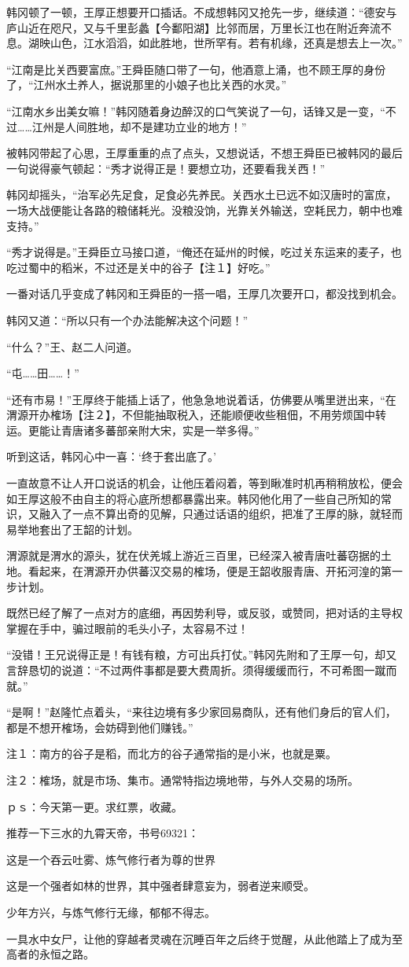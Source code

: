 韩冈顿了一顿，王厚正想要开口插话。不成想韩冈又抢先一步，继续道：“德安与庐山近在咫尺，又与千里彭蠡【今鄱阳湖】比邻而居，万里长江也在附近奔流不息。湖映山色，江水滔滔，如此胜地，世所罕有。若有机缘，还真是想去上一次。”

“江南是比关西要富庶。”王舜臣随口带了一句，他酒意上涌，也不顾王厚的身份了，“江州水土养人，据说那里的小娘子也比关西的水灵。”

“江南水乡出美女嘛！”韩冈随着身边醉汉的口气笑说了一句，话锋又是一变，“不过……江州是人间胜地，却不是建功立业的地方！”

被韩冈带起了心思，王厚重重的点了点头，又想说话，不想王舜臣已被韩冈的最后一句说得豪气顿起：“秀才说得正是！要想立功，还要看我关西！”

韩冈却摇头，“治军必先足食，足食必先养民。关西水土已远不如汉唐时的富庶，一场大战便能让各路的粮储耗光。没粮没饷，光靠关外输送，空耗民力，朝中也难支持。”

“秀才说得是。”王舜臣立马接口道，“俺还在延州的时候，吃过关东运来的麦子，也吃过蜀中的稻米，不过还是关中的谷子【注１】好吃。”

一番对话几乎变成了韩冈和王舜臣的一搭一唱，王厚几次要开口，都没找到机会。

韩冈又道：“所以只有一个办法能解决这个问题！”

“什么？”王、赵二人问道。

“屯……田……！”

“还有市易！”王厚终于能插上话了，他急急地说着话，仿佛要从嘴里迸出来，“在渭源开办榷场【注２】，不但能抽取税入，还能顺便收些租佃，不用劳烦国中转运。更能让青唐诸多蕃部亲附大宋，实是一举多得。”

听到这话，韩冈心中一喜：‘终于套出底了。’

一直故意不让人开口说话的机会，让他压着闷着，等到瞅准时机再稍稍放松，便会如王厚这般不由自主的将心底所想都暴露出来。韩冈他化用了一些自己所知的常识，又融入了一点不算出奇的见解，只通过话语的组织，把准了王厚的脉，就轻而易举地套出了王韶的计划。

渭源就是渭水的源头，犹在伏羌城上游近三百里，已经深入被青唐吐蕃窃据的土地。看起来，在渭源开办供蕃汉交易的榷场，便是王韶收服青唐、开拓河湟的第一步计划。

既然已经了解了一点对方的底细，再因势利导，或反驳，或赞同，把对话的主导权掌握在手中，骗过眼前的毛头小子，太容易不过！

“没错！王兄说得正是！有钱有粮，方可出兵打仗。”韩冈先附和了王厚一句，却又言辞恳切的说道：“不过两件事都是要大费周折。须得缓缓而行，不可希图一蹴而就。”

“是啊！”赵隆忙点着头，“来往边境有多少家回易商队，还有他们身后的官人们，都是不想开榷场，会妨碍到他们赚钱。”

注１：南方的谷子是稻，而北方的谷子通常指的是小米，也就是粟。

注２：榷场，就是市场、集市。通常特指边境地带，与外人交易的场所。

ｐｓ：今天第一更。求红票，收藏。

推荐一下三水的九霄天帝，书号69321：

这是一个吞云吐雾、炼气修行者为尊的世界

这是一个强者如林的世界，其中强者肆意妄为，弱者逆来顺受。

少年方兴，与炼气修行无缘，郁郁不得志。

一具水中女尸，让他的穿越者灵魂在沉睡百年之后终于觉醒，从此他踏上了成为至高者的永恒之路。


